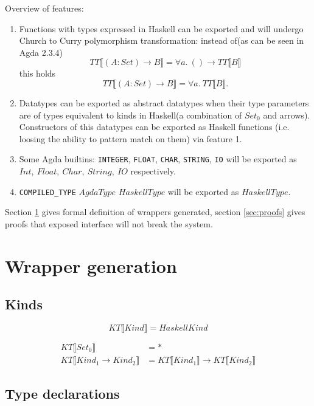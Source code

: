 Overview of features:
\begin{enumerate}
\item Functions with types expressed in Haskell can be exported and will
      undergo Church to Curry polymorphism transformation:
      instead of(as can be seen in Agda 2.3.4)
      \[
         TT\llbracket (A : Set) \rightarrow B \rrbracket = \forall a.\ () \rightarrow TT\llbracket B \rrbracket
      \]
      this holds
      \[
         TT\llbracket (A : Set) \rightarrow B \rrbracket = \forall a.\ TT\llbracket B \rrbracket.
      \]
\item Datatypes can be exported as abstract datatypes when their type
      parameters are of types equivalent to kinds in Haskell(a combination
      of \(Set_0\) and arrows).\\
      Constructors of this datatypes can be exported as Haskell functions
      (i.e. loosing the ability to pattern match on them) via feature 1.
\item Some Agda builtins: \texttt{INTEGER}, \texttt{FLOAT}, \texttt{CHAR},
      \texttt{STRING}, \texttt{IO} will be exported as \(Int,\ Float,\ Char,\ String,\ IO\)
      respectively.
\item \texttt{COMPILED\_TYPE} \(AgdaType\) \(HaskellType\) will be exported as \(HaskellType\).
\end{enumerate}

Section \ref{sec:wrappers} gives formal definition of wrappers generated,
section \ref{sec:proofs} gives proofs that exposed interface will not break the system.

\section{Wrapper generation}\label{sec:wrappers}

\subsection{Kinds}
\[ KT\llbracket Kind \rrbracket = HaskellKind \]

\begin{align*}
   KT\llbracket Set_0 \rrbracket &= *\\
   KT\llbracket Kind_1 \rightarrow Kind_2 \rrbracket &=
      KT\llbracket Kind_1 \rrbracket \rightarrow KT\llbracket Kind_2 \rrbracket
\end{align*}

\subsection{Type declarations}

